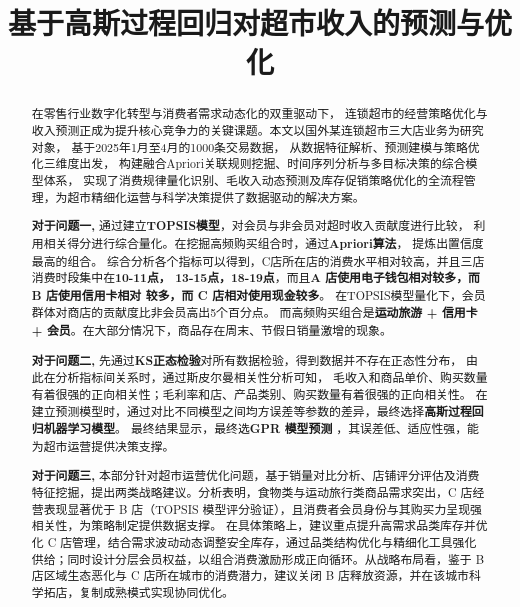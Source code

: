 \documentclass[withoutpreface,bwprint]{cumcmthesis}
\title{基于高斯过程回归对超市收入的预测与优化}  %
\begin{document}
\maketitle
\begin{abstract}%
在零售行业数字化转型与消费者需求动态化的双重驱动下，
连锁超市的经营策略优化与收入预测正成为提升核心竞争力的关键课题。本文以国外某连锁超市三大店业务为研究对象，
基于2025年1月至4月的1000条交易数据，
从数据特征解析、预测建模与策略优化三维度出发，
构建融合Apriori关联规则挖掘、时间序列分析与多目标决策的综合模型体系，
实现了消费规律量化识别、毛收入动态预测及库存促销策略优化的全流程管理，为超市精细化运营与科学决策提供了数据驱动的解决方案。

\textbf{对于问题一,}
通过建立\textbf{TOPSIS模型}，对会员与非会员对超时收入贡献度进行比较，
利用相关得分进行综合量化。在挖掘高频购买组合时，通过\textbf{Apriori算法}，
提炼出置信度最高的组合。
综合分析各个指标可以得到，C店所在店的消费水平相对较高，并且三店消费时段集中在\textbf{10-11点，
13-15点，18-19点}，而且\textbf{A 店使用电子钱包相对较多，而 B 店使用信用卡相对
较多，而 C 店相对使用现金较多}。
在TOPSIS模型量化下，会员群体对商店的贡献度比非会员高出5个百分点。
而高频购买组合是\textbf{运动旅游 + 信用卡 + 会员}。在大部分情况下，商品存在周末、节假日销量激增的现象。
\par

\textbf{对于问题二,}
先通过\textbf{KS正态检验}对所有数据检验，得到数据并不存在正态性分布，
由此在分析指标间关系时，通过斯皮尔曼相关性分析可知，
毛收入和商品单价、购买数量有着很强的正向相关性；毛利率和店、产品类别、购买数量有着很强的正向相关性。
在建立预测模型时，通过对比不同模型之间均方误差等参数的差异，最终选择\textbf{高斯过程回归机器学习模型}。
最终结果显示，最终选\textbf{GPR 模型预测} ，其误差低、适应性强，能为超市运营提供决策支撑。
\par

\textbf{对于问题三,}
本部分针对超市运营优化问题，基于销量对比分析、店铺评分评估及消费特征挖掘，提出两类战略建议。分析表明，食物类与运动旅行类商品需求突出，C 店经营表现显著优于 B 店（TOPSIS 模型评分验证），且消费者会员身份与其购买力呈现强相关性，为策略制定提供数据支撑。
在具体策略上，建议重点提升高需求品类库存并优化 C 店管理，结合需求波动动态调整安全库存，通过品类结构优化与精细化工具强化供给；同时设计分层会员权益，以组合消费激励形成正向循环。从战略布局看，鉴于 B 店区域生态恶化与 C 店所在城市的消费潜力，建议关闭 B 店释放资源，并在该城市科学拓店，复制成熟模式实现协同优化。
\par



\end{abstract}
\end{document}
